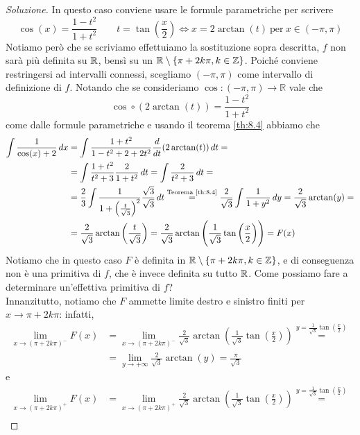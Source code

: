 \begin{proof}[Soluzione]
    In questo caso conviene usare le formule parametriche per scrivere
    \[
    \cos(x)=\frac{1-t^2}{1+t^2} \qquad t = \tan\left(\frac{x}{2}\right)\iff x = 2\arctan(t) \ \text{per} \ x\in(-\pi, \pi)
    \]
    Notiamo però che se scriviamo effettuiamo la sostituzione sopra descritta, $f$ non sarà più definita su $\amsbb{R}$, bensì su un $\amsbb{R}\setminus\{\pi+2k\pi, k\in\amsbb{Z}\}$. Poiché conviene restringersi ad intervalli connessi, scegliamo $(-\pi, \pi)$ come intervallo di definizione di $f$. Notando che se consideriamo $\cos\colon (-\pi, \pi)\to \mathbb{R}$ vale che 
    \[
    \cos \circ (2\arctan(t)) = \frac{1-t^2}{1+t^2}
    \]
    come dalle formule parametriche e usando il teorema \ref{th:8.4} abbiamo che
    \[
    \begin{split}
        \int \frac{1}{\cos(x)+2}\, dx & = \int \frac{1+t^2}{1-t^2+2+2t^2}\frac{d}{dt}(2\arctan(t))\, dt = \\
        & = \int \frac{1+t^2}{t^2+3}\frac{2}{1+t^2}\, dt = \int \frac{2}{t^2+3}\, dt  =\\
        & = \frac{2}{3}\int \frac{1}{1+\left(\frac{t}{\sqrt{3}}\right)^2}\frac{\sqrt{3}}{\sqrt{3}}\, dt \overset{\text{Teorema \ref{th:8.4}}}{=} \frac{2}{\sqrt{3}}\int \frac{1}{1+y^2}\, dy = \frac{2}{\sqrt{3}}\arctan(y) =\\
        & = \frac{2}{\sqrt{3}}\arctan\left(\frac{t}{\sqrt{3}}\right) = \frac{2}{\sqrt{3}}\arctan\left(\frac{1}{\sqrt{3}}\tan\left(\frac{x}{2}\right)\right) = F(x)
    \end{split}
    \]
    Notiamo che in questo caso $F$ è definita in $\amsbb{R}\setminus\{\pi+2k\pi, k\in\amsbb{Z}\}$, e di conseguenza non è una primitiva di $f$, che è invece definita su tutto $\amsbb{R}$. Come possiamo fare a determinare un'effettiva primitiva di $f$?\\
    Innanzitutto, notiamo che $F$ ammette limite destro e sinistro finiti per $x\to \pi+2k\pi$: infatti,
    \[
    \begin{split}
        \lim_{x\to (\pi+2k\pi)^-} F(x) & = \lim_{x\to (\pi+2k\pi)^-}\frac{2}{\sqrt{3}}\arctan\left(\frac{1}{\sqrt{3}}\tan\left(\frac{x}{2}\right)\right) \overset{y=\frac{1}{\sqrt{3}}\tan\left(\frac{x}{2}\right)}{=} \\
        & = \lim_{y\to +\infty} \frac{2}{\sqrt{3}}\arctan(y) = \frac{\pi}{\sqrt{3}}
    \end{split}
    \]
    e
    \[
    \begin{split}
        \lim_{x\to (\pi+2k\pi)^+} F(x) & = \lim_{x\to (\pi+2k\pi)^+}\frac{2}{\sqrt{3}}\arctan\left(\frac{1}{\sqrt{3}}\tan\left(\frac{x}{2}\right)\right) \overset{y=\frac{1}{\sqrt{3}}\tan\left(\frac{x}{2}\right)}{=} \\

\end{split}\]
\end{proof}
